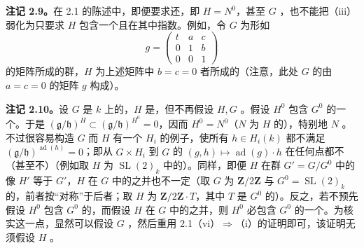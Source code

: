 \textbf{注记 2.9。}在 2.1 的陈述中，即便要求还，即 $H=N^0$，甚至 $G$ ，也不能把（iii）弱化为只要求 $H$ 包含一个且在其中指数。例如，令 $G$ 为形如
\[g=\begin{pmatrix}t&a&c\\0&1&b\\0&0&1\end{pmatrix}\]
的矩阵所成的群，$H$ 为上述矩阵中 $b=c=0$ 者所成的（注意，此处 $G$ 的由 $a=c=0$ 的矩阵 $g$ 构成）。

\textbf{注记 2.10。}设 $G$ 是 $k$ 上的，$H$ 是，但不再假设 $H,G$ 。假设 $H^0$ 包含 $G^0$ 的一个。于是 $(\mathfrak g/\mathfrak h)^H\subset(\mathfrak g/\mathfrak h)^{H^0}=0$，因而 $H^0=N^0$（$N$ 为 $H$ 的），特别地 $N$ 。不过很容易构造 $G$ 而 $H$ 有一个 $H_i$ 的例子，使所有 $h\in H_i(k)$ 都不满足 $(\mathfrak g/\mathfrak h)^{\operatorname{ad}(h)}=0$；即从 $G\times H_i$ 到 $G$ 的 $(g,h)\mapsto\operatorname{ad}(g)\cdot h$ 在任何点都不（甚至不）（例如取 $H$ 为 $\operatorname{SL}(2)_k$ 中的）。同样，即便 $H$ 在群 $G'=G/G^0$ 中的像 $H'$ 等于 $G'$，$H$ 在 $G$ 中的之并也不一定（取 $G$ 为 $\mathbf Z/2\mathbf Z$ 与 $G^0=\operatorname{SL}(2)_k$ 的，前者按“对称”于后者；取 $H$ 为 $\mathbf Z/2\mathbf Z\cdot T$，其中 $T$ 是 $G^0$ 的）。反之，若不预先假设 $H^0$ 包含 $G^0$ 的，而假设 $H$ 在 $G$ 中的之并，则 $H^0$ 必包含 $G^0$ 的一个。为核实这一点，显然可以假设 $G$ ，然后重用 2.1（vi）$\Rightarrow$（i）的证明即可，该证明无须假设 $H$ 。
